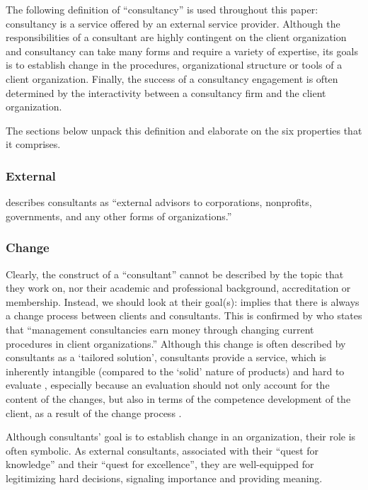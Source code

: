 \documentclass[12pt]{article}
\begin{document}
The following definition of ``consultancy'' is used throughout this
paper: consultancy is a service offered by an external service provider.
Although the responsibilities of a consultant are highly contingent on
the client organization and consultancy can take many forms and require
a variety of expertise, its goals is to establish change in the
procedures, organizational structure or tools of a client organization.
Finally, the success of a consultancy engagement is often determined by
the interactivity between a consultancy firm and the client
organization.

The sections below unpack this definition and elaborate on the six
properties that it comprises.

\hypertarget{external}{%
\subsubsection{External}\label{external}}

\citet[138]{chowdhury2021} describes consultants as ``external advisors
to corporations, nonprofits, governments, and any other forms of
organizations.''

\hypertarget{change}{%
\subsubsection{Change}\label{change}}

Clearly, the construct of a ``consultant'' cannot be described by the
topic that they work on, nor their academic and professional background,
accreditation or membership. Instead, we should look at their goal(s):
\citet[1]{werr1986} implies that there is always a change process
between clients and consultants. This is confirmed by
\citet[12]{kipping2000} who states that ``management consultancies earn
money through changing current procedures in client organizations.''
Although this change is often described by consultants as a `tailored
solution', consultants provide a service, which is inherently intangible
(compared to the `solid' nature of products) and hard to evaluate
\citep[ 348]{fincham1999}, especially because an evaluation should not
only account for the content of the changes, but also in terms of the
competence development of the client, as a result of the change process
\citep[ 17]{werr1986}.

Although consultants' goal is to establish change in an organization,
their role is often symbolic. As external consultants, associated with
their ``quest for knowledge'' and their ``quest for excellence'', they
are \citep[ 9-13]{pellegrin2006} well-equipped for legitimizing hard
decisions, signaling importance and providing meaning.
\end{document}
